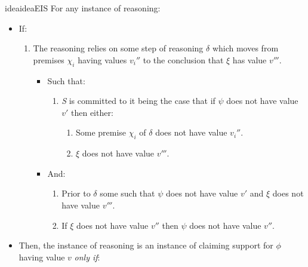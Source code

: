 \begin{note}
  \begin{restatable}{idea}{ideaEIS}
    \label{idea:CS:B}
    For any instance of reasoning:
    \begin{itemize}[leftmargin=*]
    \item
      If:
      \begin{enumerate}[resume]
      \item
        \label{idea:CS:B:step}
        The reasoning relies on some step of reasoning \(\delta\) which moves from premises \(\chi_{i}\) having values \(v_{i}''\) to the conclusion that \(\xi\) has value \(v'''\).
        \begin{itemize}
        \item
          Such that:
          \begin{enumerate}
          \item
            \label{idea:CS:B:step:commit}
            \emph{S} is committed to it being the case that if \(\psi\) does not have value \(v'\) then either:
            \begin{enumerate}
            \item
              \label{idea:CS:B:step:commit:p}
              Some premise \(\chi_{i}\) of \(\delta\) does not have value \(v_{i}''\).
            \item
              \label{idea:CS:B:step:commit:c}
              \(\xi\) does not have value \(v'''\).
            \end{enumerate}
          \end{enumerate}
        \item
          And:
          \begin{enumerate}[resume]
          \item
            \label{idea:CS:B:step:psi-ep}
            Prior to \(\delta\) some \epAdv{} \world{} such that \(\psi\) does not have value \(v'\) and \(\xi\) does not have value \(v'''\).
          \item
            \label{idea:CS:B:step:connexion}
            If \(\xi\) does not have value \(v''\) then \(\psi\) does not have value \(v''\).
          \end{enumerate}
        \end{itemize}
      \end{enumerate}
    \item
      Then, the instance of reasoning is an instance of claiming support for \(\phi\) having value \(v\) \emph{only if}:
      \begin{enumerate}[resume]

\end{enumerate}
\end{itemize}
\end{restatable}
\end{note}

